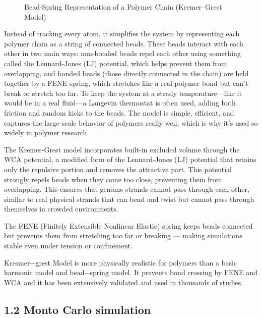 \documentclass[12pt]{article}
\begin{document}
\begin{flushleft}
\begin{figure}[!ht]
  \centering
  \caption{Bead-Spring Representation of a Polymer Chain (Kremer–Grest Model)}
\end{figure}


Instead of tracking every atom, it simplifies the system by representing each polymer chain as a string of connected beads. These beads interact with each other in two main ways: non-bonded beads repel each other using something called the Lennard-Jones (LJ) potential, which helps prevent them from overlapping, and bonded beads (those directly connected in the chain) are held together by a FENE spring, which stretches like a real polymer bond but can't break or stretch too far. To keep the system at a steady temperature—like it would be in a real fluid—a Langevin thermostat is often used, adding both friction and random kicks to the beads. The model is simple, efficient, and captures the large-scale behavior of polymers really well, which is why it's used so widely in polymer research.	



The Kremer-Grest model incorporates built-in excluded volume through the WCA potential, a modified form of the Lennard-Jones (LJ) potential that retains only the repulsive portion and removes the attractive part. This potential strongly repels beads when they come too close, preventing them from overlapping. This ensures that genome strands cannot pass through each other, similar to real physical strands that can bend and twist but cannot pass through themselves in crowded environments.

The FENE (Finitely Extensible Nonlinear Elastic) spring keeps beads connected but prevents them from stretching too far or breaking — making simulations stable even under tension or confinement.
	

Kresmer$-$grest Model is more physically realistic for polymers than a basic harmonic model and bead$-$spring model.
It prevents bond crossing by FENE and WCA and it has been extensively validated and used in thousands of studies.





\vspace{-1em} 

\subsection*{1.2 Monto Carlo simulation}


\end{flushleft}
\end{document}
